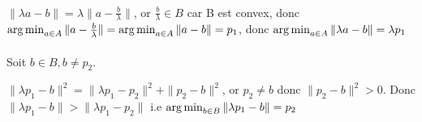 \paragraph{}
$\|\lambda a-b\| = \lambda \|a-\frac{b}{\lambda}\|$, or $\frac{b}{\lambda} \in B$ car B est convex, donc $\operatorname*{arg\,min}_{a \in A}\|a-\frac{b}{\lambda}\| = \operatorname*{arg\,min}_{a \in A}\|a-b\| = p_1$, donc $\operatorname*{arg\,min}_{a \in A}\|\lambda a-b\| = \lambda p_1$

\paragraph{}
Soit $b \in B, b \neq p_2$.

$\|\lambda p_1-b\|^2 = \|\lambda p_1-p_2\|^2 + \|p_2-b\|^2$, or $p_2 \neq b$ donc $\|p_2-b\|^2 > 0$.
Donc $\|\lambda p_1-b\| > \|\lambda p_1-p_2\|$ i.e $\operatorname*{arg\,min}_{b \in B}\|\lambda p_1-b\| = p_2 $
